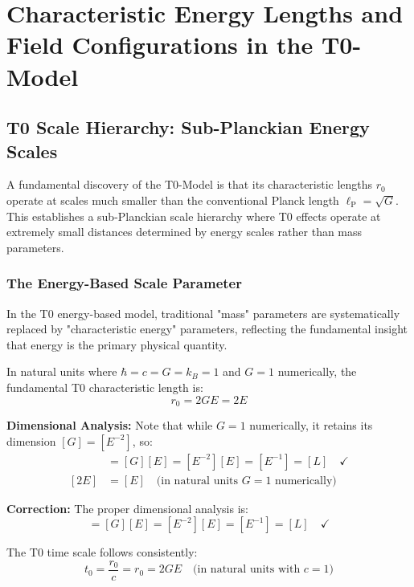 \documentclass[12pt,a4paper]{report}
\newcommand{\lP}{\ell_{\text{P}}}         %
\newcommand{\rzero}{r_0}                  %
\newcommand{\tzero}{t_0}                  %
\newcommand{\natunits}{\hbar = c = G = k_B = 1} %
\begin{document}
	\chapter{Characteristic Energy Lengths and Field Configurations in the T0-Model}\label{chap:energy_lengths_configurations}
	
	\section{T0 Scale Hierarchy: Sub-Planckian Energy Scales}\label{sec:scale_hierarchy}
	
	A fundamental discovery of the T0-Model is that its characteristic lengths $\rzero$ operate at scales much smaller than the conventional Planck length $\lP = \sqrt{G}$. This establishes a sub-Planckian scale hierarchy where T0 effects operate at extremely small distances determined by energy scales rather than mass parameters.
	
	\subsection{The Energy-Based Scale Parameter}\label{subsec:energy_scale_parameter}
	
	In the T0 energy-based model, traditional "mass" parameters are systematically replaced by "characteristic energy" parameters, reflecting the fundamental insight that energy is the primary physical quantity.
	
	In natural units where $\natunits$ and $G = 1$ numerically, the fundamental T0 characteristic length is:
	\begin{equation}
		\boxed{\rzero = 2GE = 2E}
		\label{eq:fundamental_r0}
	\end{equation}
	
	\textbf{Dimensional Analysis:}
	Note that while $G = 1$ numerically, it retains its dimension $[G] = [E^{-2}]$, so:
	\begin{align}
		[\rzero] &= [G][E] = [E^{-2}][E] = [E^{-1}] = [L] \quad \checkmark \\
		[2E] &= [E] \quad \text{(in natural units } G = 1 \text{ numerically)}
	\end{align}
	
	\textbf{Correction:} The proper dimensional analysis is:
	\begin{equation}
		[\rzero] = [G][E] = [E^{-2}][E] = [E^{-1}] = [L] \quad \checkmark
	\end{equation}
	
	The T0 time scale follows consistently:
	\begin{equation}
		\tzero = \frac{\rzero}{c} = \rzero = 2GE \quad \text{(in natural units with } c = 1\text{)}
	\end{equation}
	
\end{document}
